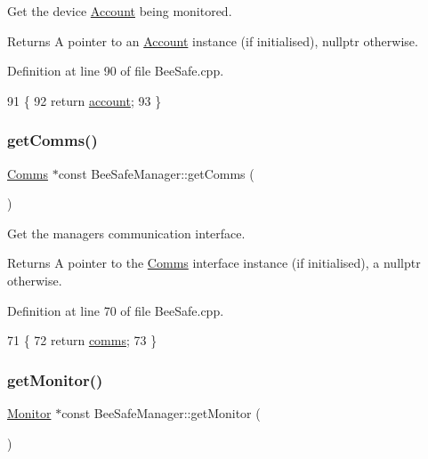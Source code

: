 Get the device \hyperlink{class_account}{Account} being monitored.

\begin{DoxyReturn}{Returns}
A pointer to an \hyperlink{class_account}{Account} instance (if initialised), nullptr otherwise. 
\end{DoxyReturn}


Definition at line 90 of file Bee\+Safe.\+cpp.


\begin{DoxyCode}
91 \{
92     \textcolor{keywordflow}{return} \hyperlink{class_bee_safe_manager_a52bc9bc8c1ea9608b83d603b142443b0}{account};
93 \}
\end{DoxyCode}
\mbox{\label{class_bee_safe_manager_a8c4c98723335cfcc179fcbf3f8c3d9d3}} 
\subsubsection{\texorpdfstring{get\+Comms()}{getComms()}}
{\footnotesize\ttfamily \hyperlink{class_comms}{Comms} $\ast$const Bee\+Safe\+Manager\+::get\+Comms (\begin{DoxyParamCaption}{ }\end{DoxyParamCaption})}

Get the managers communication interface.

\begin{DoxyReturn}{Returns}
A pointer to the \hyperlink{class_comms}{Comms} interface instance (if initialised), a nullptr otherwise. 
\end{DoxyReturn}


Definition at line 70 of file Bee\+Safe.\+cpp.


\begin{DoxyCode}
71 \{
72     \textcolor{keywordflow}{return} \hyperlink{class_bee_safe_manager_a80b19afbb679d08be14d67a45447f9e1}{comms};
73 \}
\end{DoxyCode}
\mbox{\label{class_bee_safe_manager_acc33322594eea80e4b4b21e580713c00}} 
\subsubsection{\texorpdfstring{get\+Monitor()}{getMonitor()}}
{\footnotesize\ttfamily \hyperlink{class_monitor}{Monitor} $\ast$const Bee\+Safe\+Manager\+::get\+Monitor (\begin{DoxyParamCaption}{ }\end{DoxyParamCaption})}

